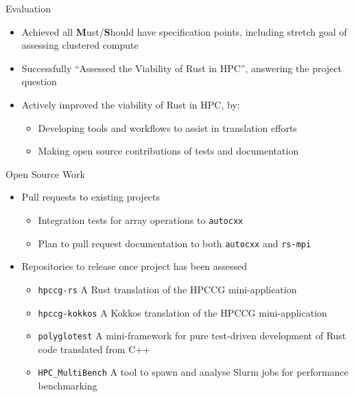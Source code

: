 \documentclass[10pt,aspectratio=169]{beamer}
\begin{document}
\begin{frame}{Evaluation}
    \begin{itemize}
        \item Achieved all \textbf{M}ust/\textbf{S}hould have specification points, including stretch goal of assessing clustered compute
        \item Successfully ``Assessed the Viability of Rust in HPC'', answering the project question
        \vspace{0.5cm}
        \item<2-> \alert{Actively improved} the viability of Rust in HPC, by:
        \begin{itemize}
            \item Developing tools and workflows to assist in translation efforts
            \item Making open source contributions of tests and documentation
        \end{itemize}
    \end{itemize}
\end{frame}


\begin{frame}{Open Source Work}
    \begin{itemize}
        \item Pull requests to existing projects
        \begin{itemize}
            \item Integration tests for array operations to \texttt{autocxx}
            \item Plan to pull request documentation to both \texttt{autocxx} and \texttt{rs-mpi}
        \end{itemize}
        \item Repositories to release once project has been assessed
        \begin{itemize}
            \item \texttt{hpccg-rs} A Rust translation of the HPCCG mini-application
            \item \texttt{hpccg-kokkos} A Kokkos translation of the HPCCG mini-application
            \item \texttt{polyglotest} A mini-framework for pure test-driven development of Rust code translated from C++
            \item \texttt{HPC\_MultiBench} A tool to spawn and analyse Slurm jobs for performance benchmarking
        \end{itemize}
    \end{itemize}
\end{frame}
\end{document}

